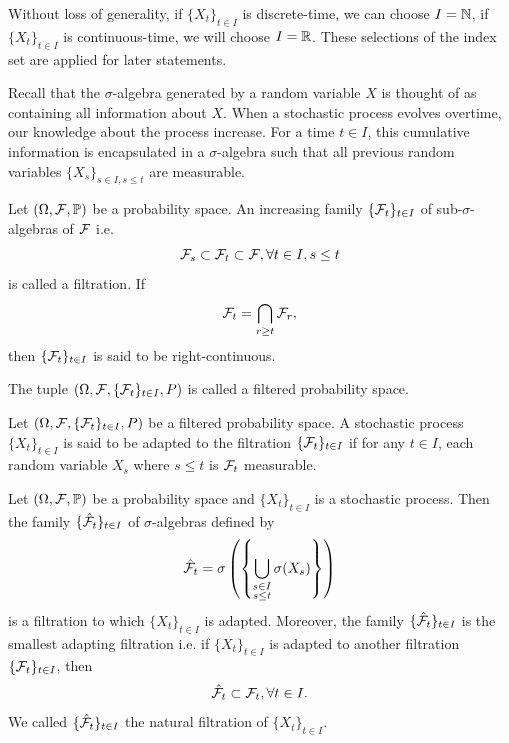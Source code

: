 \begin{remark}
  Without loss of generality, if $\{X_t\}_{t\in I}$ is discrete-time, we can choose $I = \mathbb{N}$, if $\{X_t\}_{t\in I}$ is continuous-time, we will choose $I=\mathbb{R}$. These selections of the index set are applied for later statements.
\end{remark}

Recall that the $\sigma$-algebra generated by a random variable $X$ is thought of as containing all information about $X$. When a stochastic process evolves overtime, our knowledge about the process increase. For a time $t\in I$, this cumulative information is encapsulated in a $\sigma$-algebra such that all previous random variables $\{X_s\}_{s\in I, s\le t}$ are measurable.

\begin{definition}
  Let $(\Omega, \mathcal{F}, \mathbb{P})$ be a probability space. An increasing family $\{\mathcal{F}_t\}_{t\in I}$ of sub-$\sigma$-algebras of $\mathcal{F}$ i.e.
  $$\mathcal{F}_s\subset\mathcal{F}_t \subset \mathcal{F}, \forall t\in I, s\le t$$
  is called a filtration. If
  $$\mathcal{F}_t = \bigcap\limits_{r\ge t} \mathcal{F}_r,$$
  then $\{\mathcal{F}_t\}_{t\in I}$ is said to be right-continuous.

  The tuple $(\Omega, \mathcal{F}, \{\mathcal{F}_t\}_{t\in I}, P)$ is called a filtered probability space.
\end{definition}

\begin{definition}
  Let $(\Omega, \mathcal{F}, \{\mathcal{F}_t\}_{t\in I}, P)$ be a filtered probability space. A stochastic process $\{X_t\}_{t\in I}$ is said to be adapted to the filtration $\{\mathcal{F}_t\}_{t\in I}$ if for any $t\in I$, each random variable $X_s$ where $s\le t$ is $\mathcal{F}_t$ measurable.
\end{definition}

\begin{theorem}
  Let $(\Omega, \mathcal{F}, \mathbb{P})$ be a probability space and $\{X_t\}_{t\in I}$ is a stochastic process. Then the family $\{\hat{\mathcal{F}}_t\}_{t\in I}$ of $\sigma$-algebras defined by
  $$\hat{\mathcal{F}}_t = \sigma\left(\left\{\bigcup\limits_{\substack{s\in I \\ s\le t}} \sigma(X_s)\right\}\right)$$
  is a filtration to which $\{X_t\}_{t\in I}$ is adapted. Moreover, the family $\{\hat{\mathcal{F}}_t\}_{t\in I}$ is the smallest adapting filtration i.e. if $\{X_t\}_{t\in I}$ is adapted to another filtration $\{\mathcal{F}_t\}_{t\in I}$, then
  $$\hat{\mathcal{F}}_t \subset \mathcal{F}_t, \forall t\in I.$$
  We called $\{\hat{\mathcal{F}}_t\}_{t\in I}$ the natural filtration  of $\{X_t\}_{t\in I}$.
\end{theorem}

